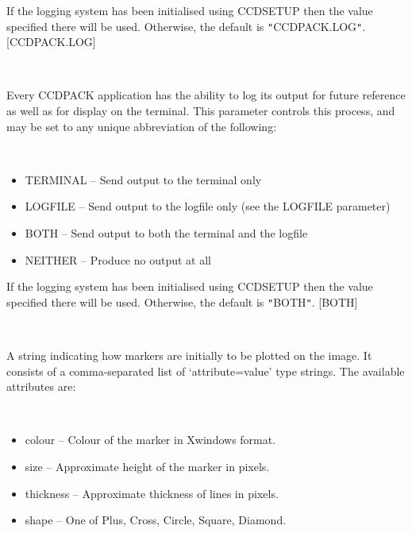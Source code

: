 \documentclass[twoside,11pt]{article}
\newcommand{\htmlref}[2]{#1}
\renewcommand{\_}{\texttt{\symbol{95}}}
\newcommand{\qt}[1]{{\tt "}#1{\tt "}}
\newcommand{\xroutine}[1]{\htmlref{{\sc #1}}{#1}}
\newcommand{\sstsubsection}[1]{ \item[{#1}] \mbox{} \\}
\newcommand{\sstitemlist}[1]{
  \mbox{} \\
  \vspace{-3.5ex}
  \begin{itemize}
     #1
  \end{itemize}
}
\newcommand{\sstitem}{\item}
\newcommand{\sstsubsection}[1]{\item[{#1}]}
\newcommand{\sstitemlist}[1]{
      \begin{itemize}
         #1
      \end{itemize}
      \\
   }
\newcommand{\sstitem}{\item}
\begin{document}
{{{         If the logging system has been initialised using \xroutine{CCDSETUP}
         then the value specified there will be used. Otherwise, the
         default is \qt{CCDPACK.LOG}.
         [CCDPACK.LOG]
      }
      \sstsubsection{
         LOGTO = LITERAL (Read)
      }{
         Every CCDPACK application has the ability to log its output
         for future reference as well as for display on the terminal.
         This parameter controls this process, and may be set to any
         unique abbreviation of the following:
         \sstitemlist{

            \sstitem
               TERMINAL  -- Send output to the terminal only

            \sstitem
               LOGFILE   -- Send output to the logfile only (see the
                               LOGFILE parameter)

            \sstitem
               BOTH      -- Send output to both the terminal and the
                               logfile

            \sstitem
               NEITHER   -- Produce no output at all

         }
         If the logging system has been initialised using \xroutine{CCDSETUP}
         then the value specified there will be used. Otherwise, the
         default is \qt{BOTH}.
         [BOTH]
      }
      \sstsubsection{
         MARKSTYLE = LITERAL (Read and Write)
      }{
         A string indicating how markers are initially to be plotted on
         the image.  It consists of a comma-separated list of 
         `attribute=value' type strings.  The available attributes are:
          \sstitemlist{

            \sstitem
              colour     -- Colour of the marker in Xwindows format.

            \sstitem
              size       -- Approximate height of the marker in pixels.

            \sstitem
              thickness  -- Approximate thickness of lines in pixels.

            \sstitem
              shape      -- One of Plus, Cross, Circle, Square, Diamond.

}}}}
\end{document}
